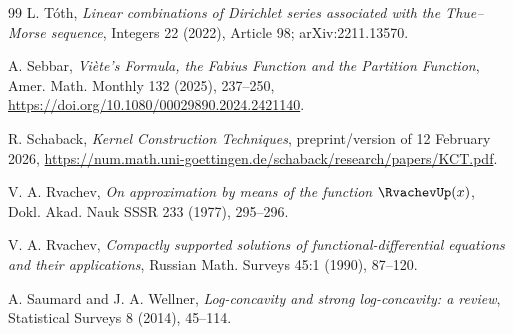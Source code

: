 \documentclass[11pt]{article}
\theoremstyle{definition}
\theoremstyle{remark}
\begin{document}
\begin{thebibliography}{99}
L. T\'oth,
\emph{Linear combinations of Dirichlet series associated with the Thue--Morse sequence},
Integers 22 (2022), Article 98; arXiv:2211.13570.

A. Sebbar,
\emph{Vi\`ete's Formula, the Fabius Function and the Partition Function},
Amer. Math. Monthly 132 (2025), 237--250,
\url{https://doi.org/10.1080/00029890.2024.2421140}.

R. Schaback,
\emph{Kernel Construction Techniques},
preprint/version of 12 February 2026,
\url{https://num.math.uni-goettingen.de/schaback/research/papers/KCT.pdf}.

V. A. Rvachev,
\emph{On approximation by means of the function $\RvachevUp(x)$},
Dokl. Akad. Nauk SSSR 233 (1977), 295--296.

V. A. Rvachev,
\emph{Compactly supported solutions of functional-differential equations and their applications},
Russian Math. Surveys 45:1 (1990), 87--120.

A. Saumard and J. A. Wellner,
\emph{Log-concavity and strong log-concavity: a review},
Statistical Surveys 8 (2014), 45--114.

\end{thebibliography}
\end{document}
